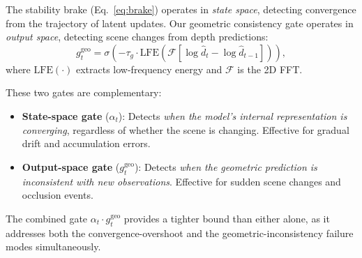 The stability brake (Eq.~\ref{eq:brake}) operates in \emph{state space}, detecting convergence from the trajectory of latent updates. Our geometric consistency gate operates in \emph{output space}, detecting scene changes from depth predictions:
\begin{equation}
    g_t^{\text{geo}} = \sigma\left(-\tau_g \cdot \text{LFE}\left(\mathcal{F}\left[\log \hat{d}_t - \log \hat{d}_{t-1}\right]\right)\right),
\end{equation}
where $\text{LFE}(\cdot)$ extracts low-frequency energy and $\mathcal{F}$ is the 2D FFT.

These two gates are complementary:
\begin{itemize}
    \item \textbf{State-space gate} ($\alpha_t$): Detects \emph{when the model's internal representation is converging}, regardless of whether the scene is changing. Effective for gradual drift and accumulation errors.
    \item \textbf{Output-space gate} ($g_t^{\text{geo}}$): Detects \emph{when the geometric prediction is inconsistent with new observations}. Effective for sudden scene changes and occlusion events.
\end{itemize}
The combined gate $\alpha_t \cdot g_t^{\text{geo}}$ provides a tighter bound than either alone, as it addresses both the convergence-overshoot and the geometric-inconsistency failure modes simultaneously.
